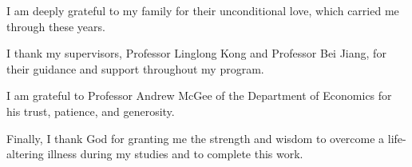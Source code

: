 I am deeply grateful to my family for their unconditional love, which carried me through these years.

I thank my supervisors, Professor Linglong Kong and Professor Bei Jiang, for their guidance and support throughout my program.

I am grateful to Professor Andrew McGee of the Department of Economics for his trust, patience, and generosity.

Finally, I thank God for granting me the strength and wisdom to overcome a life-altering illness during my studies and to complete this work.

